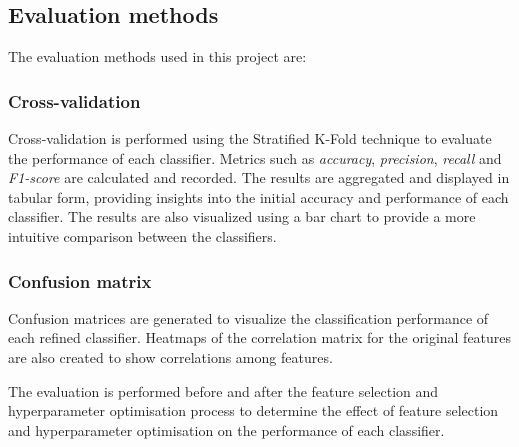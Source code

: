 \subsection{Evaluation methods}
	The evaluation methods used in this project are:
	\subsubsection{Cross-validation}
		Cross-validation is performed using the Stratified K-Fold technique to evaluate the performance of each classifier. Metrics such as \emph{accuracy}, \emph{precision}, \emph{recall} and \emph{F1-score} are calculated and recorded. The results are aggregated and displayed in tabular form, providing insights into the initial accuracy and performance of each classifier. The results are also visualized using a bar chart to provide a more intuitive comparison between the classifiers. 
	\subsubsection{Confusion matrix}
		Confusion matrices are generated to visualize the classification performance of each refined classifier. Heatmaps of the correlation matrix for the original features are also created to show correlations among features. 

	The evaluation is performed before and after the feature selection and hyperparameter optimisation process to determine the effect of feature selection and hyperparameter optimisation on the performance of each classifier. 
	
